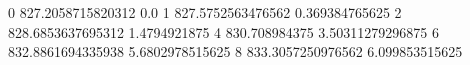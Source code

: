 0 827.2058715820312 0.0
1 827.5752563476562 0.369384765625
2 828.6853637695312 1.4794921875
4 830.708984375 3.50311279296875
6 832.8861694335938 5.6802978515625
8 833.3057250976562 6.099853515625
